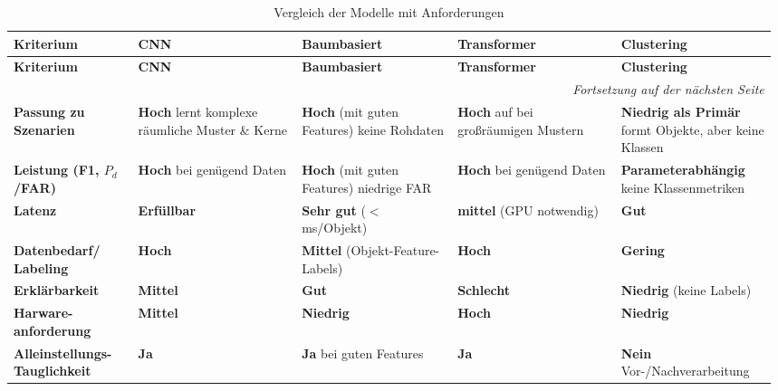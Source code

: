 \small
\begin{longtable}{p{0.16\linewidth}p{0.21\linewidth}p{0.2\linewidth}p{0.21\linewidth}p{0.2\linewidth}}
\caption{Vergleich der Modelle mit Anforderungen}\\
\toprule
\textbf{Kriterium} &
\textbf{CNN} &
\textbf{Baumbasiert} &
\textbf{Transformer} &
\textbf{Clustering} \\
\midrule
\endfirsthead

\toprule
\textbf{Kriterium} &
\textbf{CNN} &
\textbf{Baumbasiert} &
\textbf{Transformer} &
\textbf{Clustering} \\
\midrule
\endhead

\midrule
\multicolumn{5}{r}{\emph{Fortsetzung auf der nächsten Seite}}\\
\midrule
\endfoot

\bottomrule
\endlastfoot

\textbf{Passung zu Szenarien} &
\textbf{Hoch} lernt komplexe räumliche Muster \& Kerne &
\textbf{Hoch} (mit guten Features) keine Rohdaten &
\textbf{Hoch} auf bei großräumigen Mustern &
\textbf{Niedrig als Primär} formt Objekte, aber keine Klassen \\

\textbf{Leistung (F1, $P_d$/FAR)} &
\textbf{Hoch} bei genügend Daten &
\textbf{Hoch} (mit guten Features) niedrige FAR &
\textbf{Hoch} bei genügend Daten &
\textbf{Parameterabhängig} keine Klassenmetriken \\

\textbf{Latenz} &
\textbf{Erfüllbar}&
\textbf{Sehr gut} ($<\,$ms/Objekt) &
\textbf{mittel} (GPU notwendig) &
\textbf{Gut} \\

\textbf{Datenbedarf/ Labeling} &
\textbf{Hoch}  &
\textbf{Mittel} (Objekt-Feature-Labels) &
\textbf{Hoch} &
\textbf{Gering} \\

\textbf{Erklärbarkeit} &
\textbf{Mittel}  &
\textbf{Gut}  &
\textbf{Schlecht}  &
\textbf{Niedrig} (keine Labels) \\

\textbf{Harware- anforderung} &
\textbf{Mittel}  &
\textbf{Niedrig} &
\textbf{Hoch}  &
\textbf{Niedrig} \\

\textbf{Alleinstellungs-Tauglichkeit} &
\textbf{Ja}  &
\textbf{Ja} bei guten Features &
\textbf{Ja}  &
\textbf{Nein} Vor-/Nachverarbeitung \\
\end{longtable}

